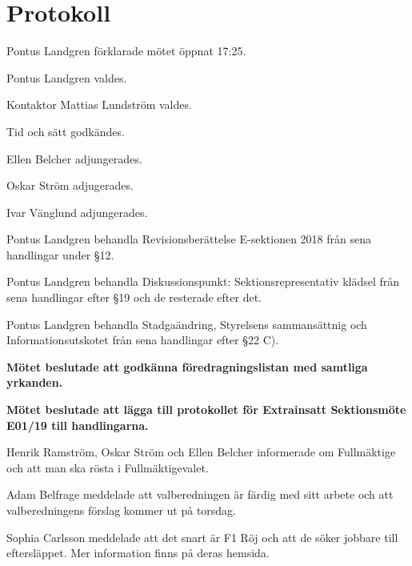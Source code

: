 \documentclass[10pt]{article}
\def\mo{Pontus Landgren}
\def\ms{Mattias Lundström}
\begin{document}
\newpage
\section*{Protokoll}

\begin{paragrafer}
{\mo} förklarade mötet öppnat 17:25.

{\mo} valdes.

Kontaktor {\ms} valdes.

Tid och sätt godkändes.


\valavj

Ellen Belcher adjungerades.

Oskar Ström adjugerades.

Ivar Vänglund adjungerades. 


Pontus Landgren \ypa behandla Revisionsberättelse E-sektionen 2018 från sena handlingar under \S12. 

Pontus Landgren \ypa behandla Diskussionspunkt: Sektionsrepresentativ klädsel från sena handlingar efter \S19 och de resterade efter det. 

Pontus Landgren \ypa behandla Stadgaändring, Styrelsens sammansättnig och Informationsutskotet från sena handlingar efter \S22 C). 

\textbf{Mötet beslutade att godkänna föredragningslistan med samtliga yrkanden.}


\textbf{Mötet beslutade att lägga till protokollet för Extrainsatt Sektionsmöte E01/19 till handlingarna.}

Henrik Ramström, Oskar Ström och Ellen Belcher informerade om Fullmäktige och att man ska rösta i Fullmäktigevalet. 

Adam Belfrage meddelade att valberedningen är färdig med sitt arbete och att valberedningens förslag kommer ut på torsdag. 

Sophia Carlsson meddelade att det snart är F1 Röj och att de söker jobbare till eftersläppet. Mer information finns på deras hemsida. 


\end{paragrafer}
\end{document}
